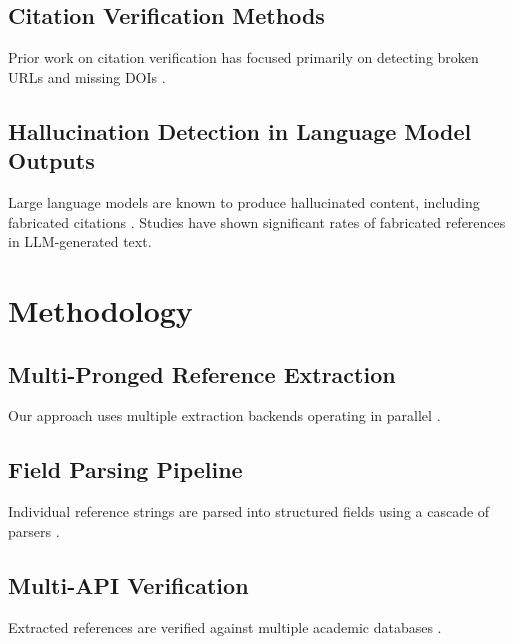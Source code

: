 \documentclass[11pt]{article}
\begin{document}
\lipsum[6-8]

\subsection{Citation Verification Methods}

Prior work on citation verification has focused primarily on detecting broken URLs and missing DOIs \cite{lewis-etal-2020-bart,park-etal-2022-neural}.

\lipsum[9-11]

\subsection{Hallucination Detection in Language Model Outputs}

Large language models are known to produce hallucinated content, including fabricated citations \cite{pennington-etal-2014-glove,devlin-etal-2020-recursive-hallucinated}. Studies have shown significant rates of fabricated references in LLM-generated text.

\lipsum[12-14]

\section{Methodology}

\subsection{Multi-Pronged Reference Extraction}

Our approach uses multiple extraction backends operating in parallel \cite{peters-etal-2018-deep,zhang-etal-2023-adaptive}.

\lipsum[15-17]

\subsection{Field Parsing Pipeline}

Individual reference strings are parsed into structured fields using a cascade of parsers \cite{devlin-etal-2019-bert,vaswani-etal-2017-attention}.

\lipsum[18-20]

\subsection{Multi-API Verification}

Extracted references are verified against multiple academic databases \cite{brown-etal-2020-language,liu2019roberta,park-etal-2022-neural}.
\end{document}
